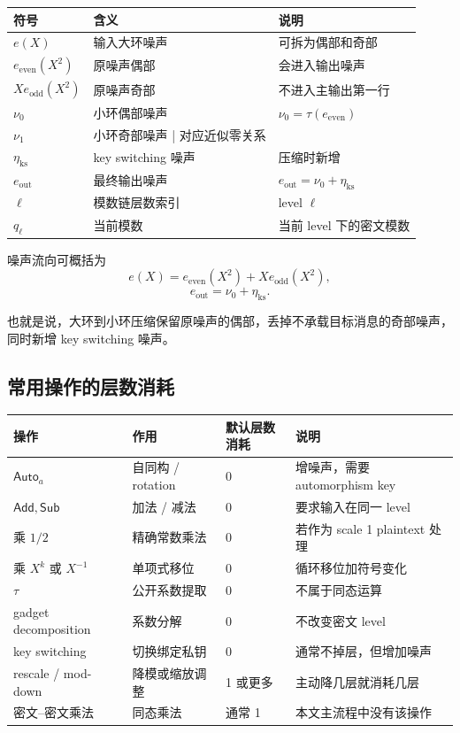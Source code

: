 \documentclass[11pt]{article}
\newcommand{\Auto}{\mathsf{Auto}}
\newcommand{\Add}{\mathsf{Add}}
\newcommand{\Sub}{\mathsf{Sub}}
\begin{document}
\begin{center}
\begin{tabular}{lll}
\toprule
符号 & 含义 & 说明 \\
\midrule
\(e(X)\) & 输入大环噪声 & 可拆为偶部和奇部 \\
\(e_{\mathrm{even}}(X^2)\) & 原噪声偶部 & 会进入输出噪声 \\
\(Xe_{\mathrm{odd}}(X^2)\) & 原噪声奇部 & 不进入主输出第一行 \\
\(\nu_0\) & 小环偶部噪声 & \(\nu_0=\tau(e_{\mathrm{even}})\) \\
\(\nu_1\) & 小环奇部噪声 | 对应近似零关系 \\
\(\eta_{\mathrm{ks}}\) & key switching 噪声 & 压缩时新增 \\
\(e_{\mathrm{out}}\) & 最终输出噪声 & \(e_{\mathrm{out}}=\nu_0+\eta_{\mathrm{ks}}\) \\
\(\ell\) & 模数链层数索引 & level \(\ell\) \\
\(q_\ell\) & 当前模数 & 当前 level 下的密文模数 \\
\bottomrule
\end{tabular}
\end{center}

噪声流向可概括为
\[
e(X)=e_{\mathrm{even}}(X^2)+Xe_{\mathrm{odd}}(X^2),
\]
\[
e_{\mathrm{out}}=\nu_0+\eta_{\mathrm{ks}}.
\]

也就是说，大环到小环压缩保留原噪声的偶部，丢掉不承载目标消息的奇部噪声，同时新增 key switching 噪声。

\subsection{常用操作的层数消耗}

\begin{center}
\begin{tabular}{llll}
\toprule
操作 & 作用 & 默认层数消耗 & 说明 \\
\midrule
\(\Auto_a\) & 自同构 / rotation & 0 & 增噪声，需要 automorphism key \\
\(\Add,\Sub\) & 加法 / 减法 & 0 & 要求输入在同一 level \\
乘 \(1/2\) & 精确常数乘法 & 0 & 若作为 scale 1 plaintext 处理 \\
乘 \(X^k\) 或 \(X^{-1}\) & 单项式移位 & 0 & 循环移位加符号变化 \\
\(\tau\) & 公开系数提取 & 0 & 不属于同态运算 \\
gadget decomposition & 系数分解 & 0 & 不改变密文 level \\
key switching & 切换绑定私钥 & 0 & 通常不掉层，但增加噪声 \\
rescale / mod-down & 降模或缩放调整 & 1 或更多 & 主动降几层就消耗几层 \\
密文--密文乘法 & 同态乘法 & 通常 1 & 本文主流程中没有该操作 \\
\bottomrule
\end{tabular}
\end{center}
\end{document}
